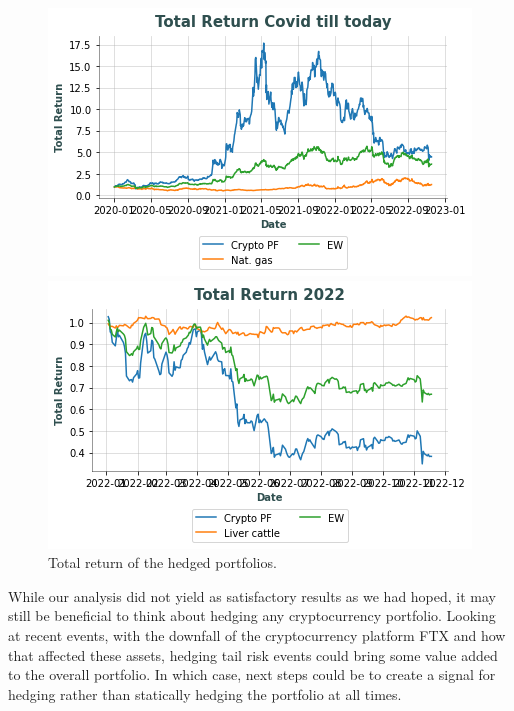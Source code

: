 \documentclass[11pt]{article}
\begin{document}
\begin{figure}[H]
\begin{minipage}[b]{0.5\textwidth}
    \includegraphics[width=\textwidth]{images/natgas_covid_today.png}
    
  \end{minipage}
  \hfill
  \begin{minipage}[b]{0.5\textwidth}
    \includegraphics[width=\textwidth]{images/liverC_ytd.png}
    
  \end{minipage}
  \caption{Total return of the hedged portfolios.}
  \label{fig:totret}
\end{figure}

While our analysis did not yield as satisfactory results as we had hoped, it may still be beneficial to think about hedging any cryptocurrency portfolio. Looking at recent events, with the downfall of the cryptocurrency platform FTX and how that affected these assets, hedging tail risk events could bring some value added to the overall portfolio. In which case, next steps could be to create a signal for hedging rather than statically hedging the portfolio at all times. 











\clearpage

\nocite{*}
\printbibliography
 

\clearpage
\end{document}
